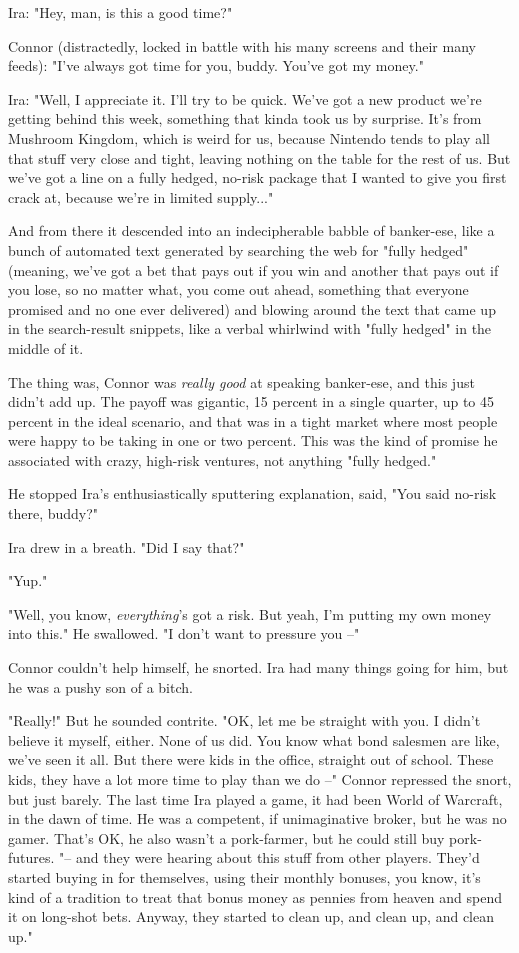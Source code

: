 Ira: "Hey, man, is this a good time?"

Connor (distractedly, locked in battle with his many screens and
their many feeds): "I've always got time for you, buddy. You've got
my money."

Ira: "Well, I appreciate it. I'll try to be quick. We've got a new
product we're getting behind this week, something that kinda took
us by surprise. It's from Mushroom Kingdom, which is weird for us,
because Nintendo tends to play all that stuff very close and tight,
leaving nothing on the table for the rest of us. But we've got a
line on a fully hedged, no-risk package that I wanted to give you
first crack at, because we're in limited supply..."

And from there it descended into an indecipherable babble of
banker-ese, like a bunch of automated text generated by searching
the web for "fully hedged" (meaning, we've got a bet that pays out
if you win and another that pays out if you lose, so no matter
what, you come out ahead, something that everyone promised and no
one ever delivered) and blowing around the text that came up in the
search-result snippets, like a verbal whirlwind with "fully hedged"
in the middle of it.

The thing was, Connor was \emph{really good} at speaking
banker-ese, and this just didn't add up. The payoff was gigantic,
15 percent in a single quarter, up to 45 percent in the ideal
scenario, and that was in a tight market where most people were
happy to be taking in one or two percent. This was the kind of
promise he associated with crazy, high-risk ventures, not anything
"fully hedged."

He stopped Ira's enthusiastically sputtering explanation, said,
"You said no-risk there, buddy?"

Ira drew in a breath. "Did I say that?"

"Yup."

"Well, you know, \emph{everything}'s got a risk. But yeah, I'm
putting my own money into this." He swallowed. "I don't want to
pressure you --"

Connor couldn't help himself, he snorted. Ira had many things going
for him, but he was a pushy son of a bitch.

"Really!" But he sounded contrite. "OK, let me be straight with
you. I didn't believe it myself, either. None of us did. You know
what bond salesmen are like, we've seen it all. But there were kids
in the office, straight out of school. These kids, they have a lot
more time to play than we do --" Connor repressed the snort, but
just barely. The last time Ira played a game, it had been World of
Warcraft, in the dawn of time. He was a competent, if unimaginative
broker, but he was no gamer. That's OK, he also wasn't a
pork-farmer, but he could still buy pork-futures. "-- and they were
hearing about this stuff from other players. They'd started buying
in for themselves, using their monthly bonuses, you know, it's kind
of a tradition to treat that bonus money as pennies from heaven and
spend it on long-shot bets. Anyway, they started to clean up, and
clean up, and clean up."

